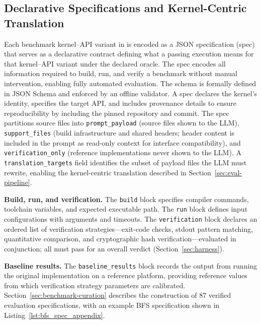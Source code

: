 \subsection{Declarative Specifications and Kernel-Centric Translation}
\label{sec:spec-schema}

Each benchmark kernel–API variant in \parbench{} is encoded as a JSON specification (spec) that serves as a declarative contract defining what a passing execution means for that kernel--API variant under the declared oracle. The spec encodes all information required to build, run, and verify a benchmark without manual intervention, enabling fully automated evaluation. The schema is formally defined in JSON Schema and enforced by an offline validator. A spec declares the kernel's identity, specifies the target API, and includes provenance details to ensure reproducibility by including the pinned repository and commit. The spec partitions source files into \texttt{prompt\_payload} (source files shown to the LLM), \texttt{support\_files} (build infrastructure and shared headers; header content is included in the prompt as read-only context for interface compatibility), and \texttt{verification\_only} (reference implementations never shown to the LLM). A \texttt{translation\_targets} field identifies the subset of payload files the LLM must rewrite, enabling the kernel-centric translation described in Section~\ref{sec:eval-pipeline}.

\textbf{Build, run, and verification.} The \texttt{build} block specifies compiler commands, toolchain variables, and expected executable path. The \texttt{run} block defines input configurations with arguments and timeouts. The \texttt{verification} block declares an ordered list of verification strategies---exit-code checks, stdout pattern matching, quantitative comparison, and cryptographic hash verification---evaluated in conjunction; all must pass for an overall \pass{} verdict (Section~\ref{sec:harness}).

\textbf{Baseline results.} The \texttt{baseline\_results} block records the output from running the original implementation on a reference platform, providing reference values from which verification strategy parameters are calibrated. Section~\ref{sec:benchmark-curation} describes the construction of 87 verified evaluation specifications, with an example BFS specification shown in Listing~\ref{lst:bfs_spec_appendix}.



